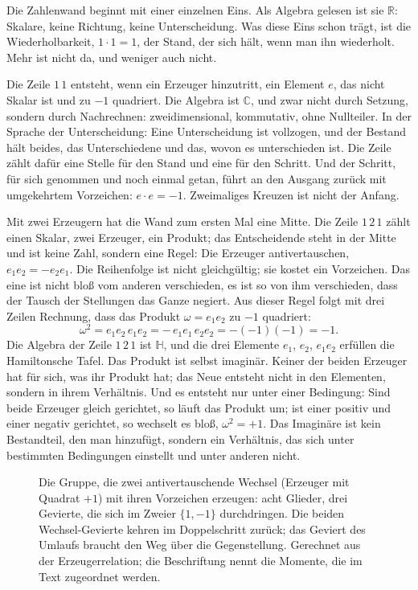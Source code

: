 \documentclass[11pt,a4paper]{article}
\newcommand{\R}{\mathbb R}
\newcommand{\C}{\mathbb C}
\newcommand{\HH}{\mathbb H}
\begin{document}
Die Zahlenwand beginnt mit einer einzelnen Eins. Als Algebra gelesen ist sie $\R$: Skalare, keine Richtung, keine Unterscheidung. Was diese Eins schon trägt, ist die Wiederholbarkeit, $1\cdot1=1$, der Stand, der sich hält, wenn man ihn wiederholt. Mehr ist nicht da, und weniger auch nicht.

Die Zeile $1\,1$ entsteht, wenn ein Erzeuger hinzutritt, ein Element $e$, das nicht Skalar ist und zu $-1$ quadriert. Die Algebra ist $\C$, und zwar nicht durch Setzung, sondern durch Nachrechnen: zweidimensional, kommutativ, ohne Nullteiler. In der Sprache der Unterscheidung: Eine Unterscheidung ist vollzogen, und der Bestand hält beides, das Unterschiedene und das, wovon es unterschieden ist. Die Zeile zählt dafür eine Stelle für den Stand und eine für den Schritt. Und der Schritt, für sich genommen und noch einmal getan, führt an den Ausgang zurück mit umgekehrtem Vorzeichen: $e\cdot e=-1$. Zweimaliges Kreuzen ist nicht der Anfang.

Mit zwei Erzeugern hat die Wand zum ersten Mal eine Mitte. Die Zeile $1\,2\,1$ zählt einen Skalar, zwei Erzeuger, ein Produkt; das Entscheidende steht in der Mitte und ist keine Zahl, sondern eine Regel: Die Erzeuger antivertauschen, $e_1e_2=-e_2e_1$. Die Reihenfolge ist nicht gleichgültig; sie kostet ein Vorzeichen. Das eine ist nicht bloß vom anderen verschieden, es ist so von ihm verschieden, dass der Tausch der Stellungen das Ganze negiert. Aus dieser Regel folgt mit drei Zeilen Rechnung, dass das Produkt $\omega=e_1e_2$ zu $-1$ quadriert:
\begin{equation}
  \omega^2=e_1e_2\,e_1e_2=-\,e_1e_1\,e_2e_2=-(-1)(-1)=-1 .
\end{equation}
Die Algebra der Zeile $1\,2\,1$ ist $\HH$, und die drei Elemente $e_1$, $e_2$, $e_1e_2$ erfüllen die Hamiltonsche Tafel. Das Produkt ist selbst imaginär. Keiner der beiden Erzeuger hat für sich, was ihr Produkt hat; das Neue entsteht nicht in den Elementen, sondern in ihrem Verhältnis. Und es entsteht nur unter einer Bedingung: Sind beide Erzeuger gleich gerichtet, so läuft das Produkt um; ist einer positiv und einer negativ gerichtet, so wechselt es bloß, $\omega^2=+1$. Das Imaginäre ist kein Bestandteil, den man hinzufügt, sondern ein Verhältnis, das sich unter bestimmten Bedingungen einstellt und unter anderen nicht.

\begin{figure}[h]
\centering

\caption[Das Geacht der Form]{Die Gruppe, die zwei antivertauschende Wechsel (Erzeuger mit Quadrat $+1$) mit ihren Vorzeichen erzeugen: acht Glieder, drei Gevierte, die sich im Zweier $\{1,-1\}$ durchdringen. Die beiden Wechsel-Gevierte kehren im Doppelschritt zurück; das Geviert des Umlaufs braucht den Weg über die Gegenstellung. Gerechnet aus der Erzeugerrelation; die Beschriftung nennt die Momente, die im Text zugeordnet werden.}
\label{fig:geacht}
\end{figure}
\end{document}
